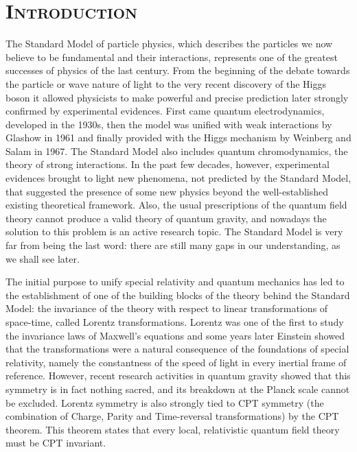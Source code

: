 \chapter{\textsc{Introduction}}
	The Standard Model of particle physics, which describes the particles we now believe to be fundamental and their interactions, represents one of the greatest successes of physics of the last century. From the beginning of the debate towards the particle or wave nature of light to the very recent discovery of the Higgs boson it allowed physicists to make powerful and precise prediction later strongly confirmed by experimental evidences. First came quantum electrodynamics, developed in the 1930s, then the model was unified with weak interactions by Glashow in 1961 and finally provided with the Higgs mechanism by Weinberg and Salam in 1967. The Standard Model also includes quantum chromodynamics, the theory of strong interactions. In the past few decades, however, experimental evidences brought to light new phenomena, not predicted by the Standard Model, that suggested the presence of some new physics beyond the well-established existing theoretical framework. Also, the usual prescriptions of the quantum field theory cannot produce a valid theory of quantum gravity, and nowadays the solution to this problem is an active research topic. The Standard Model is very far from being the last word: there are still many gaps in our understanding, as we shall see later.

	The initial purpose to unify special relativity and quantum mechanics has led to the establishment of one of the building blocks of the theory behind the Standard Model: the invariance of the theory with respect to linear transformations of space-time, called Lorentz transformations. Lorentz was one of the first to study the invariance laws of Maxwell's equations and some years later Einstein showed that the transformations were a natural consequence of the foundations of special relativity, namely the constantness of the speed of light in every inertial frame of reference. However, recent research activities in quantum gravity showed that this symmetry is in fact nothing sacred, and its breakdown at the Planck scale cannot be excluded. Lorentz symmetry is also strongly tied to CPT symmetry (the combination of Charge, Parity and Time-reversal transformations) by the CPT theorem. This theorem states that every local, relativistic quantum field theory must be CPT invariant.

